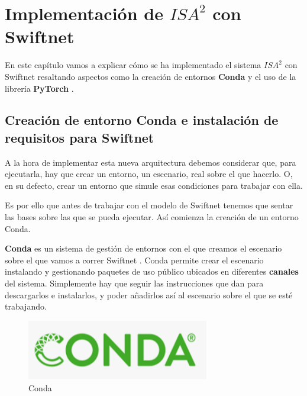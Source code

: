 \chapter{Implementación de $ISA^{2}$ con Swiftnet}

En este capítulo vamos a explicar cómo se ha implementado el sistema $ISA^{2}$ con Swiftnet resaltando aspectos como la creación de entornos \textbf{Conda} \cite{conda} y el uso de la librería \textbf{PyTorch} \cite{pytorch}.

\section{Creación de entorno Conda e instalación de requisitos para Swiftnet}
A la hora de implementar esta nueva arquitectura debemos considerar que, para ejecutarla, hay que crear un entorno, un escenario, real sobre el que hacerlo. O, en su defecto, crear un entorno que simule esas condiciones para trabajar con ella.

Es por ello que antes de trabajar con el modelo de Swiftnet \cite{swiftnet} tenemos que sentar las bases sobre las que se pueda ejecutar. Así comienza la creación de un entorno Conda.

\textbf{Conda} \cite{conda} es un sistema de gestión de entornos con el que creamos el escenario sobre el que vamos a correr Swiftnet \cite{swiftnet}. Conda permite crear el escenario instalando y gestionando paquetes de uso público ubicados en diferentes \textbf{canales} del sistema. Simplemente hay que seguir las instrucciones que dan para descargarlos e instalarlos, y poder añadirlos así al escenario sobre el que se esté trabajando.

\begin{figure}[H]
  \centering
  \includegraphics[width=8cm]{Figuras/Conda.eps}
  \caption{Conda}
\end{figure}

